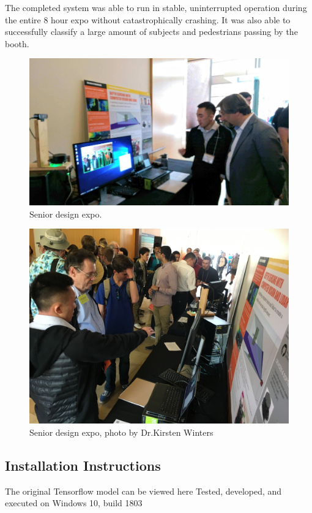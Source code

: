 \documentclass[onecolumn, draftclsnofoot,10pt, compsoc]{IEEEtran}
\makeatletter
\newcommand\captionof[1]{\def\@captype{#1}\caption}
\makeatother
\begin{document}
\begin{singlespace}
		The completed system was able to run in stable, uninterrupted operation during the entire 8 hour expo without catastrophically crashing. 
		It was also able to successfully classify a large amount of subjects and pedestrians passing by the booth.

		\begin{figure}[H]
		\includegraphics[scale=0.15]{expo1.jpg}
		\captionof{figure}{Senior design expo.}
		\label{expo1}
		\end{figure}

		\begin{figure}[H]
		\includegraphics[scale=0.1]{expo2.jpg}
		\captionof{figure}{Senior design expo, photo by Dr.Kirsten Winters}
		\label{expo2}
		\end{figure}

	\subsection{Installation Instructions}
		The original Tensorflow model can be viewed here 
		Tested, developed, and executed on Windows 10, build 1803


\end{singlespace}
\end{document}
